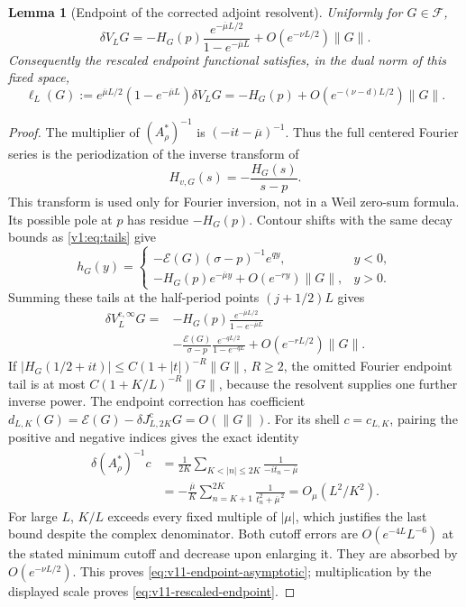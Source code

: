 \documentclass[11pt]{article}
\newtheorem{lemma}[theorem]{Lemma}
\theoremstyle{remark}
\newcommand{\Jc}{J^{\mathrm c}}
\newcommand{\E}{\mathscr E}
\begin{document}
\begin{lemma}[Endpoint of the corrected adjoint resolvent]
\label{lem:v11-resolvent-endpoint}
Uniformly for $G\in\mathcal F$,
\begin{equation}\label{eq:v11-endpoint-asymptotic}
 \delta V_LG
 =-H_G(p)\frac{e^{-\overline\mu L/2}}{1-e^{-\overline\mu L}}
       +O(e^{-\nu L/2})\|G\|.
\end{equation}
Consequently the rescaled endpoint functional satisfies, in the dual
norm of this fixed space,
\begin{equation}\label{eq:v11-rescaled-endpoint}
 \ell_L(G):=e^{\overline\mu L/2}(1-e^{-\overline\mu L})\delta V_LG
 =-H_G(p)+O(e^{-(\nu-d)L/2})\|G\|.
\end{equation}
\end{lemma}
\begin{proof}
The multiplier of $(A_\rho^*)^{-1}$ is
$(-it-\overline\mu)^{-1}$. Thus the full centered Fourier series is
the periodization of the inverse transform of
\[
 H_{v,G}(s)=-\frac{H_G(s)}{s-p}.
\]
This transform is used only for Fourier inversion, not in a Weil
zero-sum formula. Its possible pole at $p$ has residue $-H_G(p)$.
Contour shifts with the same decay bounds as \eqref{v1:eq:tails} give
\[
 h_G(y)=
 \begin{cases}
 -\E(G)(\sigma-p)^{-1}e^{qy},&y<0,\\
 -H_G(p)e^{-\overline\mu y}+O(e^{-ry})\|G\|,&y>0.
 \end{cases}
\]
Summing these tails at the half-period points $(j+1/2)L$ gives
\begin{align*}
 \delta V_L^{\mathrm c,\infty}G
 ={}&-H_G(p)\frac{e^{-\overline\mu L/2}}{1-e^{-\overline\mu L}}\\
 &-\frac{\E(G)}{\sigma-p}
          \frac{e^{-qL/2}}{1-e^{-qL}}+O(e^{-rL/2})\|G\|.
\end{align*}
If $|H_G(1/2+it)|\le C(1+|t|)^{-R}\|G\|$, $R\ge2$,
the omitted Fourier endpoint tail is at most
$C(1+K/L)^{-R}\|G\|$, because the resolvent supplies one further
inverse power. The endpoint correction has coefficient
$d_{L,K}(G)=\E(G)-\delta\Jc_{L,2K}G=O(\|G\|)$.
For its shell $c=c_{L,K}$, pairing the positive and negative indices
gives the exact identity
\begin{equation}\label{eq:v11-shell-resolvent}
 \begin{split}
 \delta(A_\rho^*)^{-1}c
 &=\frac1{2K}\sum_{K<|n|\le2K}\frac1{-it_n-\overline\mu}\\
 &=-\frac{\overline\mu}{K}
       \sum_{n=K+1}^{2K}\frac1{t_n^2+\overline\mu^{\,2}}
   =O_\mu(L^2/K^2).
 \end{split}
\end{equation}
For large $L$, $K/L$ exceeds every fixed multiple of $|\mu|$,
which justifies the last bound despite the complex denominator.
Both cutoff errors are $O(e^{-4L}L^{-6})$ at the stated minimum
cutoff and decrease upon enlarging it. They are absorbed by
$O(e^{-\nu L/2})$. This proves \eqref{eq:v11-endpoint-asymptotic};
multiplication by the displayed scale proves
\eqref{eq:v11-rescaled-endpoint}.
\end{proof}
\end{document}
